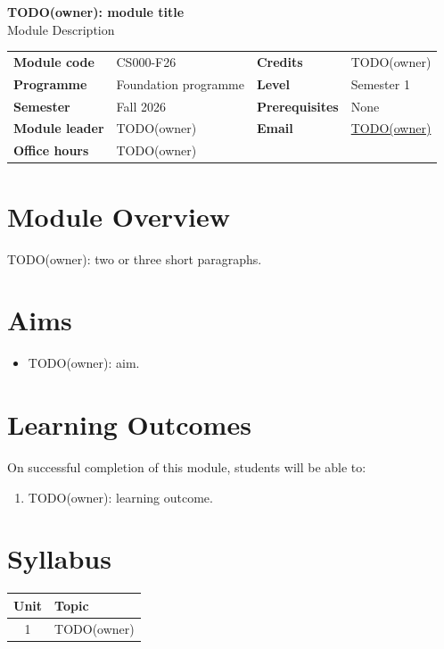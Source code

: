 \documentclass[11pt,a4paper]{article}
\newcommand{\ModuleTitle}{TODO(owner): module title}
\newcommand{\ModuleCode}{CS000-F26}
\newcommand{\Programme}{Foundation programme}
\newcommand{\Level}{Semester 1}
\newcommand{\Semester}{Fall 2026}
\newcommand{\Credits}{TODO(owner)}      %
\newcommand{\ModuleLeader}{TODO(owner)}
\newcommand{\Email}{TODO(owner)}
\newcommand{\OfficeHours}{TODO(owner)}
\newcommand{\Prerequisites}{None}
\begin{document}
\begin{center}
  {\LARGE\bfseries\color{accent} \ModuleTitle}\\[4pt]
  {\large Module Description}
\end{center}
\vspace{6pt}

\begin{tabularx}{\textwidth}{>{\bfseries}l X >{\bfseries}l X}
\toprule
Module code   & \ModuleCode    & Credits      & \Credits \\
Programme     & \Programme     & Level        & \Level \\
Semester      & \Semester      & Prerequisites & \Prerequisites \\
Module leader & \ModuleLeader  & Email        & \href{mailto:\Email}{\Email} \\
Office hours  & \multicolumn{3}{l}{\OfficeHours} \\
\bottomrule
\end{tabularx}

\section{Module Overview}
TODO(owner): two or three short paragraphs.

\section{Aims}
\begin{itemize}
  \item TODO(owner): aim.
\end{itemize}

\section{Learning Outcomes}
On successful completion of this module, students will be able to:
\begin{enumerate}[label=LO\arabic*.]
  \item TODO(owner): learning outcome.
\end{enumerate}

\section{Syllabus}
\begin{tabularx}{\textwidth}{c X}
\toprule
\textbf{Unit} & \textbf{Topic} \\
\midrule
1  & TODO(owner) \\
\bottomrule
\end{tabularx}
\end{document}
